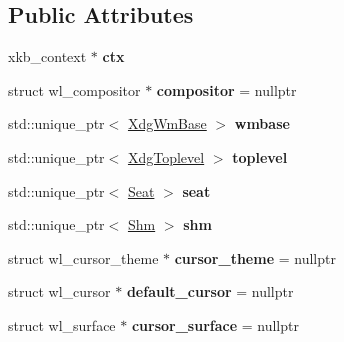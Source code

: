 \subsection*{Public Attributes}
\begin{DoxyCompactItemize}
\item 
\mbox{\label{classWlWindow_a0f35aa21e60e3f2742583ea567f0b50d}} 
xkb\+\_\+context $\ast$ {\bfseries ctx}
\item 
\mbox{\label{classWlWindow_a3e770b481629e0dcdf5942c962d515dc}} 
struct wl\+\_\+compositor $\ast$ {\bfseries compositor} = nullptr
\item 
\mbox{\label{classWlWindow_a54c1d34be697f321e9a7f0f6f107d49e}} 
std\+::unique\+\_\+ptr$<$ \mbox{\hyperlink{classXdgWmBase}{Xdg\+Wm\+Base}} $>$ {\bfseries wmbase}
\item 
\mbox{\label{classWlWindow_a3a8e2d77f65c59573674aac8c945adcf}} 
std\+::unique\+\_\+ptr$<$ \mbox{\hyperlink{classXdgToplevel}{Xdg\+Toplevel}} $>$ {\bfseries toplevel}
\item 
\mbox{\label{classWlWindow_a1bee7de01e5fe19a34da688d2870e649}} 
std\+::unique\+\_\+ptr$<$ \mbox{\hyperlink{classSeat}{Seat}} $>$ {\bfseries seat}
\item 
\mbox{\label{classWlWindow_a997eb2e60e3cb947f9b39987ca7b2694}} 
std\+::unique\+\_\+ptr$<$ \mbox{\hyperlink{classShm}{Shm}} $>$ {\bfseries shm}
\item 
\mbox{\label{classWlWindow_afe6b25bb716387514baa83ae71dd328d}} 
struct wl\+\_\+cursor\+\_\+theme $\ast$ {\bfseries cursor\+\_\+theme} = nullptr
\item 
\mbox{\label{classWlWindow_ae7e7a900726e82771adeaf9ff559dabd}} 
struct wl\+\_\+cursor $\ast$ {\bfseries default\+\_\+cursor} = nullptr
\item 
\mbox{\label{classWlWindow_ad720e626f034781737b553ec0ffacd19}} 
struct wl\+\_\+surface $\ast$ {\bfseries cursor\+\_\+surface} = nullptr
\item 
\mbox{\label{classWlWindow_a49a606361d87174457c36e429ee35732}} 

\end{DoxyCompactItemize}
